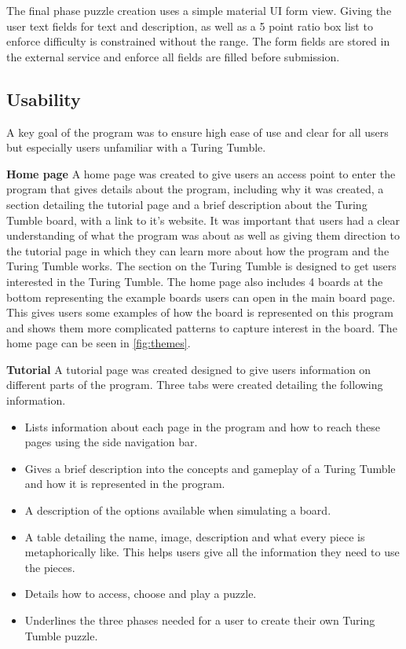 \documentclass{l4proj}
\begin{document}
The final phase puzzle creation uses a simple material UI form view. Giving the user text fields for text and description, as well as a 5 point ratio box list to enforce difficulty is constrained without the range. The form fields are stored in the external service and enforce all fields are filled before submission.

\subsection{Usability}
A key goal of the program was to ensure high ease of use and clear for all users but especially users unfamiliar with a Turing Tumble. 

\textbf{Home page}
A home page was created to give users an access point to enter the program that gives details about the program, including why it was created, a section detailing the tutorial page and a brief description about the Turing Tumble board, with a link to it's website. It was important that users had a clear understanding of what the program was about as well as giving them direction to the tutorial page in which they can learn more about how the program and the Turing Tumble works. The section on the Turing Tumble is designed to get users interested in the Turing Tumble. The home page also includes 4 boards at the bottom representing the example boards users can open in the main board page. This gives users some examples of how the board is represented on this program and shows them more complicated patterns to capture interest in the board. The home page can be seen in \ref{fig:themes}.

\textbf{Tutorial}
A tutorial page was created designed to give users information on different parts of the program. Three tabs were created detailing the following information.
\begin{itemize}
    \item Lists information about each page in the program and how to reach these pages using the side navigation bar.
    \item Gives a brief description into the concepts and gameplay of a Turing Tumble and how it is represented in the program.
    \item A description of the options available when simulating a board.
    \item A table detailing the name, image, description and what every piece is metaphorically like. This helps users give all the information they need to use the pieces.
    \item Details how to access, choose and play a puzzle.
    \item Underlines the three phases needed for a user to create their own Turing Tumble puzzle.
\end{itemize}
\end{document}
